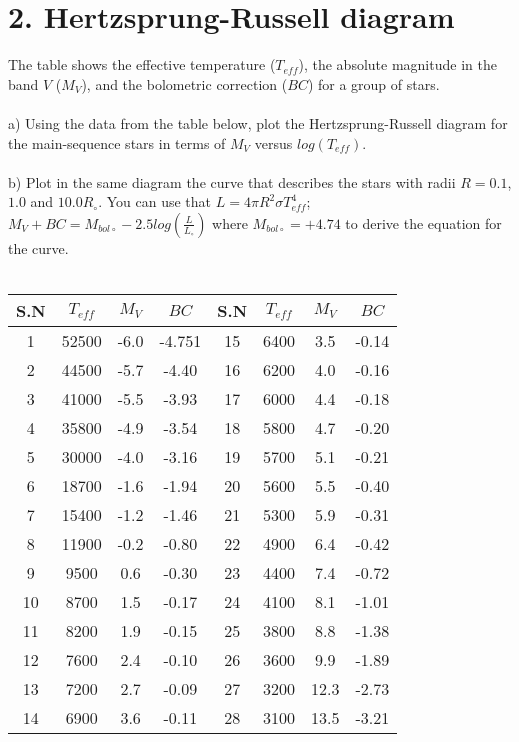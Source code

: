 \section*{2. Hertzsprung-Russell diagram}

The table shows the effective temperature ($T_{eff}$), the absolute magnitude in the band $V$ ($M_V$),
and the bolometric correction ($BC$) for a group of stars.\\
\\
a) Using the data from the table below, plot the Hertzsprung-Russell diagram for the main-sequence stars
in terms of $M_V$ versus $log(T_{eff})$.\\
\\
b) Plot in the same diagram the curve that describes the stars with radii $R = 0.1$, $1.0$ and 
$10.0 R_\circ$. You can use that 
$L = 4 \pi R^2 \sigma T^4_{eff}$; $M_V + BC = M_{bol \circ} - 2.5 log(\frac{L}{L_\circ})$ where 
$M_{bol \circ} = + 4.74$ to derive the equation for the curve.\\
\\
\begin{center}
  \begin{tabular}{||c|c|c|c||c|c|c|c||}
    S.N & $T_{eff}$ & $M_V$ & $BC$ & S.N & $T_{eff}$ & $M_V$ & $BC$\\
        \hline
    1 & 52500 & -6.0 & -4.751 & 15 & 6400 & 3.5 & -0.14\\
    2 & 44500 & -5.7 & -4.40 & 16 & 6200 & 4.0 & -0.16\\
    3 & 41000 & -5.5 & -3.93 & 17 & 6000 & 4.4 & -0.18\\
    4 & 35800 & -4.9 & -3.54 & 18 & 5800 & 4.7 & -0.20\\
    5 & 30000 & -4.0 & -3.16 & 19 & 5700 & 5.1 & -0.21\\
    6 & 18700 & -1.6 & -1.94 & 20 & 5600 & 5.5 & -0.40\\
    7 & 15400 & -1.2 & -1.46 & 21 & 5300 & 5.9 & -0.31\\
    8 & 11900 & -0.2 & -0.80 & 22 & 4900 & 6.4 & -0.42\\
    9 & 9500 & 0.6 & -0.30 & 23 & 4400 & 7.4 & -0.72\\
    10 & 8700 & 1.5 & -0.17 & 24 & 4100 & 8.1 & -1.01\\
    11 & 8200 & 1.9 & -0.15 & 25 & 3800 & 8.8 & -1.38\\
    12 & 7600 & 2.4 & -0.10 & 26 & 3600 & 9.9 & -1.89\\
    13 & 7200 & 2.7 & -0.09 & 27 & 3200 & 12.3 & -2.73\\
    14 & 6900 & 3.6 & -0.11 & 28 & 3100 & 13.5 & -3.21\\
    \end{tabular}
\end{center}
